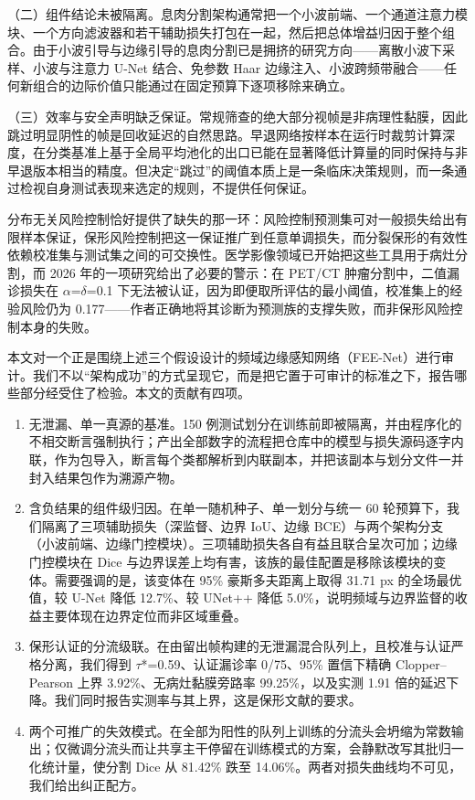 \documentclass[conference]{IEEEtran}
\begin{document}
（二）组件结论未被隔离。息肉分割架构通常把一个小波前端、一个通道注意力模块、一个方向滤波器和若干辅助损失打包在一起，然后把总体增益归因于整个组合。由于小波引导与边缘引导的息肉分割已是拥挤的研究方向——离散小波下采样\cite{zhao2023wranet}、小波与注意力 U-Net 结合\cite{rajasekar2024adaptunet}、免参数 Haar 边缘注入\cite{yeemeganet2025}、小波跨频带融合\cite{oh2026crossband}——任何新组合的边际价值只能通过在固定预算下逐项移除来确立。

（三）效率与安全声明缺乏保证。常规筛查的绝大部分视帧是非病理性黏膜，因此跳过明显阴性的帧是回收延迟的自然思路。早退网络按样本在运行时裁剪计算深度\cite{laskaridis2021earlyexit}，在分类基准上基于全局平均池化的出口已能在显著降低计算量的同时保持与非早退版本相当的精度\cite{demir2024earlyexit}。但决定“跳过”的阈值本质上是一条临床决策规则，而一条通过检视自身测试表现来选定的规则，不提供任何保证。

分布无关风险控制恰好提供了缺失的那一环：风险控制预测集可对一般损失给出有限样本保证\cite{bates2021rcps}，保形风险控制把这一保证推广到任意单调损失\cite{angelopoulos2022crc}，而分裂保形的有效性依赖校准集与测试集之间的可交换性\cite{angelopoulos2021gentle}。医学影像领域已开始把这些工具用于病灶分割\cite{tan2025cls,dai2025crcfdr}，而 2026 年的一项研究给出了必要的警示：在 PET/CT 肿瘤分割中，二值漏诊损失在 $\alpha$=$\delta$=0.1 下无法被认证，因为即便取所评估的最小阈值，校准集上的经验风险仍为 0.177——作者正确地将其诊断为预测族的支撑失败，而非保形风险控制本身的失败\cite{zheng2026crc}。

本文对一个正是围绕上述三个假设设计的频域边缘感知网络（FEE-Net）进行审计。我们不以“架构成功”的方式呈现它，而是把它置于可审计的标准之下，报告哪些部分经受住了检验。本文的贡献有四项。

\begin{enumerate}
  \item 无泄漏、单一真源的基准。150 例测试划分在训练前即被隔离，并由程序化的不相交断言强制执行；产出全部数字的流程把仓库中的模型与损失源码逐字内联，作为包导入，断言每个类都解析到内联副本，并把该副本与划分文件一并封入结果包作为溯源产物。
  \item 含负结果的组件级归因。在单一随机种子、单一划分与统一 60 轮预算下，我们隔离了三项辅助损失（深监督、边界 IoU、边缘 BCE）与两个架构分支（小波前端、边缘门控模块）。三项辅助损失各自有益且联合呈次可加；边缘门控模块在 Dice 与边界误差上均有害，该族的最佳配置是移除该模块的变体。需要强调的是，该变体在 95\% 豪斯多夫距离上取得 31.71 px 的全场最优值，较 U-Net 降低 12.7\%、较 UNet++ 降低 5.0\%，说明频域与边界监督的收益主要体现在边界定位而非区域重叠。
  \item 保形认证的分流级联。在由留出帧构建的无泄漏混合队列上，且校准与认证严格分离，我们得到 $\tau$*=0.59、认证漏诊率 0/75、95\% 置信下精确 Clopper–Pearson 上界 3.92\%、无病灶黏膜旁路率 99.25\%，以及实测 1.91 倍的延迟下降。我们同时报告实测率与其上界，这是保形文献的要求。
  \item 两个可推广的失效模式。在全部为阳性的队列上训练的分流头会坍缩为常数输出；仅微调分流头而让共享主干停留在训练模式的方案，会静默改写其批归一化统计量，使分割 Dice 从 81.42\% 跌至 14.06\%。两者对损失曲线均不可见，我们给出纠正配方。
\end{enumerate}
\end{document}
